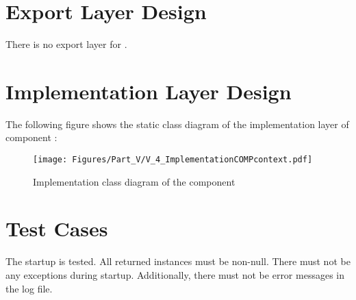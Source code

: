 
\section{Export Layer Design}
\label{sec:ExportDesignCOMPcontext}

There is no export layer for \COMPcontext{}.


\section{Implementation Layer Design}
\label{sec:ImplementationDesignCOMPcontext}

The following figure shows the static class diagram of the implementation layer of component \COMPcontext{}:

\begin{figure}[H]
	\centering
	\texttt{[image: Figures/Part\_V/V\_4\_ImplementationCOMPcontext.pdf]}
	\caption{Implementation class diagram of the component \COMPcontext{}}
	\label{fig:V_4_ImplementationCOMPcontext}
\end{figure}


\section{Test Cases}
\label{sec:TestCasesCOMPcontext}

The startup is tested. All returned instances must be non-null. There must not be any exceptions during startup. Additionally, there must not be error messages in the log file.

%
%
